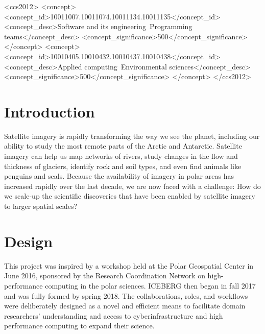 \documentclass[manuscript,screen]{acmart}
\begin{document}
\begin{CCSXML}
	<ccs2012>
	<concept>
	<concept_id>10011007.10011074.10011134.10011135</concept_id>
	<concept_desc>Software and its engineering~Programming teams</concept_desc>
	<concept_significance>500</concept_significance>
	</concept>
	<concept>
	<concept_id>10010405.10010432.10010437.10010438</concept_id>
	<concept_desc>Applied computing~Environmental sciences</concept_desc>
	<concept_significance>500</concept_significance>
	</concept>
	</ccs2012>
\end{CCSXML}



\maketitle

\section{Introduction}
Satellite imagery is rapidly transforming the way we see the planet, including our ability to study the most remote parts of the Arctic and Antarctic. Satellite imagery can help us map networks of rivers, study changes in the flow and thickness of glaciers, identify rock and soil types, and even find animals like penguins and seals. Because the availability of imagery in polar areas has increased rapidly over the last decade, we are now faced with a challenge: How do we scale-up the scientific discoveries that have been enabled by satellite imagery to larger spatial scales?

\section{Design}
This project was inspired by a workshop held at the Polar Geospatial Center in June 2016, sponsored by the Research Coordination Network on high-performance computing in the polar sciences.  ICEBERG then began in fall 2017 and was fully formed by spring 2018.  The collaborations, roles, and workflows were deliberately designed as a novel and efficient means to facilitate domain researchers' understanding and access to cyberinfrastructure and high performance computing to expand their science. 
\end{document}
